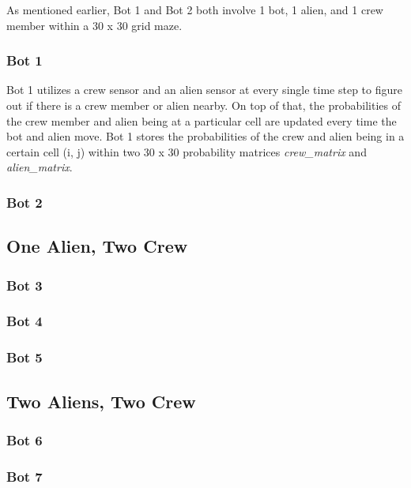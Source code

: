 \documentclass[11pt]{article}
\begin{document}
As mentioned earlier, Bot 1 and Bot 2 both involve 1 bot, 1 alien, and 1 crew member within a 30 x 30 grid maze.

\subsubsection{Bot 1}

Bot 1 utilizes a crew sensor and an alien sensor at every single time step to figure out if there is a crew member or alien nearby. On top of that, the probabilities of the crew member and alien being at a particular cell are updated every time the bot and alien move. Bot 1 stores the probabilities of the crew and alien being in a certain cell (i, j) within two 30 x 30 probability matrices \textit{crew\_matrix} and \textit{alien\_matrix}.

\subsubsection{Bot 2}

\subsection{One Alien, Two Crew}

\subsubsection{Bot 3}

\subsubsection{Bot 4}

\subsubsection{Bot 5}

\subsection{Two Aliens, Two Crew}

\subsubsection{Bot 6}

\subsubsection{Bot 7}
\end{document}
